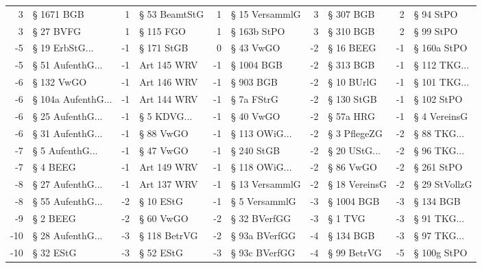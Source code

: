 \begin{tabular}{rlrlrlrlrl}
        3 &           § 1671 BGB &         1 &   § 53 BeamtStG &         1 &     § 15 VersammlG &         3 &      § 307 BGB &          2 &       § 94 StPO \\
        3 &            § 27 BVFG &         1 &       § 115 FGO &         1 &        § 163b StPO &         3 &      § 310 BGB &          2 &       § 99 StPO \\
       -5 &     § 19 ErbStG... &        -1 &      § 171 StGB &         0 &          § 43 VwGO &        -2 &      § 16 BEEG &         -1 &     § 160a StPO \\
       -5 &   § 51 AufenthG... &        -1 &     Art 145 WRV &        -1 &         § 1004 BGB &        -2 &      § 313 BGB &         -1 &  § 112 TKG... \\
       -6 &           § 132 VwGO &        -1 &     Art 146 WRV &        -1 &          § 903 BGB &        -2 &     § 10 BUrlG &         -1 &  § 101 TKG... \\
       -6 & § 104a AufenthG... &        -1 &     Art 144 WRV &        -1 &         § 7a FStrG &        -2 &     § 130 StGB &         -1 &      § 102 StPO \\
       -6 &   § 25 AufenthG... &        -1 &   § 5 KDVG... &        -1 &          § 40 VwGO &        -2 &      § 57a HRG &         -1 &    § 4 VereinsG \\
       -6 &   § 31 AufenthG... &        -1 &       § 88 VwGO &        -1 &    § 113 OWiG... &        -2 &   § 3 PflegeZG &         -2 &   § 88 TKG... \\
       -7 &    § 5 AufenthG... &        -1 &       § 47 VwGO &        -1 &         § 240 StGB &        -2 & § 20 UStG... &         -2 &   § 96 TKG... \\
       -7 &             § 4 BEEG &        -1 &     Art 149 WRV &        -1 &    § 118 OWiG... &        -2 &      § 86 VwGO &         -2 &      § 261 StPO \\
       -8 &   § 27 AufenthG... &        -1 &     Art 137 WRV &        -1 &     § 13 VersammlG &        -2 &  § 18 VereinsG &         -2 &   § 29 StVollzG \\
       -8 &   § 55 AufenthG... &        -2 &       § 10 EStG &        -1 &      § 5 VersammlG &        -3 &     § 1004 BGB &         -3 &       § 134 BGB \\
       -9 &             § 2 BEEG &        -2 &       § 60 VwGO &        -2 &       § 32 BVerfGG &        -3 &        § 1 TVG &         -3 &   § 91 TKG... \\
      -10 &   § 28 AufenthG... &        -3 &    § 118 BetrVG &        -2 &      § 93a BVerfGG &        -4 &      § 134 BGB &         -3 &   § 97 TKG... \\
      -10 &            § 32 EStG &        -3 &       § 52 EStG &        -3 &      § 93c BVerfGG &        -4 &    § 99 BetrVG &         -5 &     § 100g StPO \\
\bottomrule
\end{tabular}

\